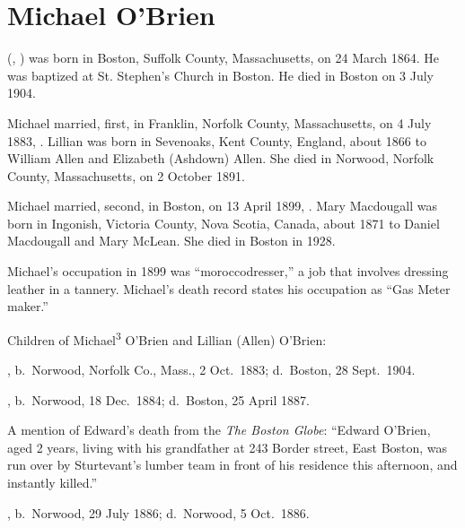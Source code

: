 \section{Michael O'Brien}

 (, ) was born in Boston, Suffolk County, Massachusetts, on 24 March 1864.\cite{Michael3OBrienBirth} He was baptized at St. Stephen's Church in Boston.\cite{Michael3OBrienBaptism} He died in Boston on 3 July 1904.\cite{Michael3OBrienBirth} 

Michael married, first, in Franklin, Norfolk County, Massachusetts, on 4 July 1883, .\cite{LillianAllenMarriage} Lillian was born in Sevenoaks, Kent County, England, about 1866 to William Allen and Elizabeth (Ashdown) Allen.\cite{LillianAllenMarriage,ElizabethAshdownDeath} She died in Norwood, Norfolk County, Massachusetts, on 2 October 1891.\cite{LillianAllenDeath} 

Michael married, second, in Boston, on 13 April 1899, .\cite{MaryMacdougallMarriage} Mary Macdougall was born in Ingonish, Victoria County, Nova Scotia, Canada, about 1871 to Daniel Macdougall and Mary McLean.\cite{MaryMacdougallMarriage} She died in Boston in 1928.\cite{MaryMacdougallDeath}

Michael's occupation in 1899 was ``moroccodresser,''\cite{MaryMacdougallMarriage} a job that involves dressing leather in a tannery.\cite{moroccodresser} Michael's death record states his occupation as ``Gas Meter maker.''\cite{Michael3OBrienDeath} 

\begin{KidsIntro}
	Children of Michael\textsuperscript{3} O'Brien and Lillian (Allen) O'Brien:
\end{KidsIntro}

\begin{Kids}
	
	, b.\ Norwood, Norfolk Co., Mass., 2 Oct.\ 1883;\cite{Arthur4OBrienBirth} d.\ Boston, 28 Sept.\ 1904.\cite{Arthur4OBrienDeath}
	
	, b.\ Norwood, 18 Dec.\ 1884;\cite{Edward4OBrienBirth} d.\ Boston, 25 April 1887.\cite{Edward4OBrienDeath}
	
	\begin{KidsMoreText}
		A mention of Edward's death from the \textit{The Boston Globe}: ``Edward O'Brien, aged 2 years, living with his grandfather at 243 Border street, East Boston, was run over by Sturtevant's lumber team in front of his residence this afternoon, and instantly killed.''\cite{Edward4OBrienDeath2}
	\end{KidsMoreText}
	
	, b.\ Norwood, 29 July 1886;\cite{Elizabeth4OBrienBirth} d.\ Norwood, 5 Oct.\ 1886.\cite{Elizabeth4OBrienDeath}
	
\end{Kids}

